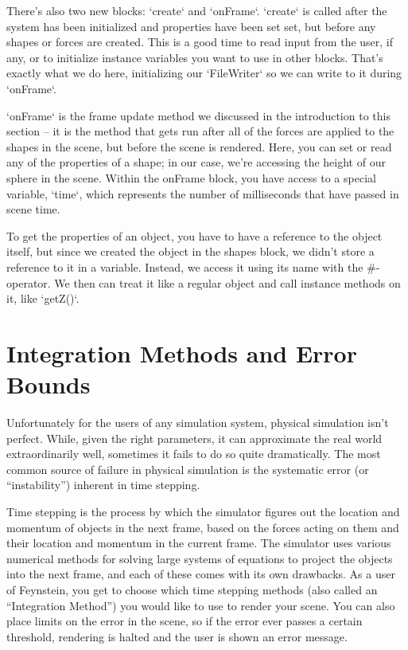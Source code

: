 \documentclass[letterpaper]{article}
\begin{document}
There's also two new blocks: `create` and `onFrame`. `create` is
called after the system has been initialized and properties have been
set set, but before any shapes or forces are created. This is a good
time to read input from the user, if any, or to initialize instance
variables you want to use in other blocks. That's exactly what we do
here, initializing our `FileWriter` so we can write to it during
`onFrame`.

`onFrame` is the frame update method we discussed in the introduction
to this section -- it is the method that gets run after all of the
forces are applied to the shapes in the scene, but before the scene is
rendered. Here, you can set or read any of the properties of a shape;
in our case, we're accessing the height of our sphere in the
scene. Within the onFrame block, you have access to a special
variable, `time`, which represents the number of milliseconds that
have passed in scene time.

To get the properties of an object, you have to have a reference to
the object itself, but since we created the object in the shapes
block, we didn't store a reference to it in a variable. Instead, we
access it using its name with the \#-operator. We then can treat it
like a regular object and call instance methods on it, like `getZ()`.

\newpage
\section{Integration Methods and Error Bounds}

Unfortunately for the users of any simulation system, physical
simulation isn't perfect. While, given the right parameters, it can
approximate the real world extraordinarily well, sometimes it fails to
do so quite dramatically. The most common source of failure in
physical simulation is the systematic error (or “instability”)
inherent in time stepping.

Time stepping is the process by which the simulator figures out the
location and momentum of objects in the next frame, based on the
forces acting on them and their location and momentum in the current
frame. The simulator uses various numerical methods for solving large
systems of equations to project the objects into the next frame, and
each of these comes with its own drawbacks. As a user of Feynstein,
you get to choose which time stepping methods (also called an
“Integration Method”) you would like to use to render your scene. You
can also place limits on the error in the scene, so if the error ever
passes a certain threshold, rendering is halted and the user is shown
an error message.
\end{document}
